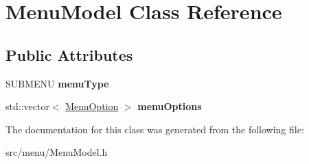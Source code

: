 \hypertarget{classMenuModel}{}\section{Menu\+Model Class Reference}
\label{classMenuModel}
\subsection*{Public Attributes}
\begin{DoxyCompactItemize}
\item 
S\+U\+B\+M\+E\+NU {\bfseries menu\+Type}\hypertarget{classMenuModel_a4609421dd81e40021f6a0870cd3ca347}{}\label{classMenuModel_a4609421dd81e40021f6a0870cd3ca347}

\item 
std\+::vector$<$ \hyperlink{classMenuOption}{Menu\+Option} $>$ {\bfseries menu\+Options}\hypertarget{classMenuModel_acdf9cc5c84acf90c5056b7124734b915}{}\label{classMenuModel_acdf9cc5c84acf90c5056b7124734b915}

\end{DoxyCompactItemize}


The documentation for this class was generated from the following file\+:\begin{DoxyCompactItemize}
\item 
src/menu/Menu\+Model.\+h\end{DoxyCompactItemize}

